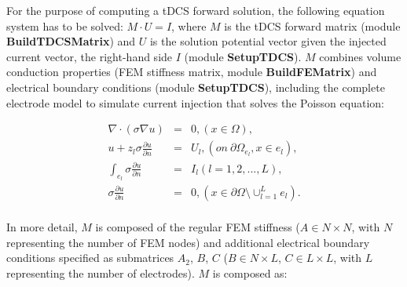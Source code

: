 \documentclass[fleqn,11pt,openany]{book}
\begin{document}
For the purpose of computing a tDCS forward solution, the following equation system has to be solved: $M \cdot U = I$, where $M$ is the tDCS forward matrix (module \textbf{BuildTDCSMatrix}) and $U$ is the solution potential vector given the injected current vector, the right-hand side $I$
(module \textbf{SetupTDCS}). $M$ combines volume conduction properties (FEM stiffness matrix, module \textbf{BuildFEMatrix}) and electrical boundary conditions (module \textbf{SetupTDCS}), including the complete electrode model to simulate current injection
that solves the Poisson equation:

\begin{center}
\begin{eqnarray*}
     \nabla \cdot (\sigma \nabla u) & = & 0 ,(x \in \Omega), \\
     u + z_{l} \sigma \frac{\partial u}{\partial n} & = & 
     U_{l} , (on\ \partial \Omega_{e_{l}},x \in e_{l}),\\ 
     \int_{e_{l}} \sigma \frac{\partial u}{\partial n} & = & 
     I_{l} (l = 1,2,...,L), \\
      \sigma \frac{\partial u}{\partial n} & = & 
      0, (x \in \partial \Omega \setminus  \cup^{L}_{l=1} e_{l}). \\
\end{eqnarray*}
\end{center}

In more detail, $M$ is composed of the regular FEM stiffness ($A \in N \times N$, with $N$ representing the number of FEM nodes) and additional electrical boundary conditions specified as submatrices $A_{2}$,
$B$, $C$ ($B \in N \times L$, $C \in L \times L$, with $L$ representing the number of electrodes).
$M$ is composed as: \\
\end{document}
